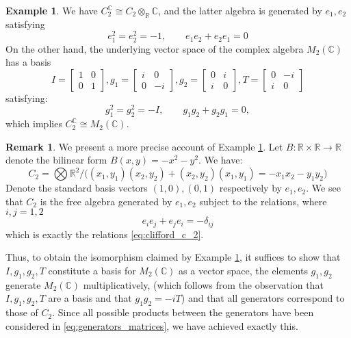 \documentclass[12pt]{article}
\theoremstyle{plain}
\theoremstyle{definition}
\newtheorem{remark}[thm]{Remark}
\newtheorem{example}[thm]{Example}
\newcommand{\bb}[1]{\mathbb{#1}}
\newcommand{\lto}{\longrightarrow}
\begin{document}
	\begin{example}\label{ex:em_two}
		We have $C_2^{\bb{C}} \cong C_2 \otimes_{\bb{R}}\bb{C}$, and the latter algebra is generated by $e_1,e_2$ satisfying
		\begin{equation}\label{eq:clifford_c_2}
			e_1^2 = e_2^2 = -1,\qquad e_1e_2 + e_2e_1 = 0
		\end{equation}
		On the other hand, the underlying vector space of the complex algebra $M_2(\bb{C})$ has a basis
		\begin{equation}
			I = \begin{bmatrix}
				1 & 0\\
				0 & 1
			\end{bmatrix}
			, g_1 = 
			\begin{bmatrix}
				i & 0\\
				0 & -i
			\end{bmatrix}, g_2 =
			\begin{bmatrix}
				0 & i \\
				i & 0
			\end{bmatrix}, T = 
			\begin{bmatrix}
				0 & -i\\
				i & 0
			\end{bmatrix}
		\end{equation}
		satisfying:
		\begin{equation}\label{eq:generators_matrices}
			g_1^2 = g_2^2 = -I,\qquad g_1g_2 + g_2g_1 = 0,
		\end{equation}
		which implies $C_2^{\bb{C}} \cong M_2(\bb{C})$.
	\end{example}
	\begin{remark}
		We present a more precise account of Example \ref{ex:em_two}. Let $B:\bb{R} \times \bb{R} \lto \bb{R}$ denote the bilinear form $B(x,y) = -x^2 - y^2$. We have:
		\begin{equation}
			C_2 = \bigotimes \bb{R}^2/\big((x_1,y_1)(x_2,y_2) + (x_2,y_2)(x_1,y_1) = -x_1x_2 - y_1y_2\big)
		\end{equation}
		Denote the standard basis vectors $(1,0),(0,1)$ respectively by $e_1,e_2$. We see that $C_2$ is the free algebra generated by $e_1,e_2$ subject to the relations, where $i,j = 1,2$
		\begin{equation}
			e_i e_j + e_j e_i = -\delta_{ij}
		\end{equation}
		which is exactly the relations \eqref{eq:clifford_c_2}.
		
		Thus, to obtain the isomorphism claimed by Example \ref{ex:em_two}, it suffices to show that $I,g_1,g_2,T$ constitute a basis for $M_2(\bb{C})$ as a vector space, the elements $g_1,g_2$ generate $M_2(\bb{C})$ multiplicatively, (which follows from the observation that $I,g_1,g_2,T$ are a basis and that $g_1g_2 = -iT$) and that all generators correspond to those of $C_2$. Since all possible products between the generators have been considered in \eqref{eq:generators_matrices}, we have achieved exactly this.
	\end{remark}
	
\end{document}
